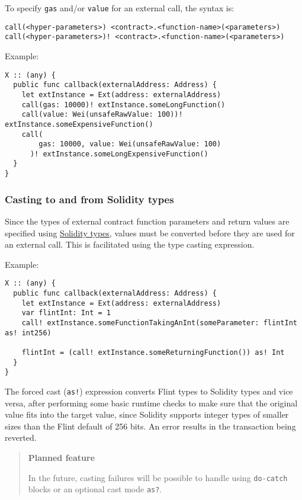 To specify \texttt{gas} and/or \texttt{value} for an external call, the syntax is:

\begin{verbatim}
call(<hyper-parameters>) <contract>.<function-name>(<parameters>)
call(<hyper-parameters>)! <contract>.<function-name>(<parameters>)
\end{verbatim}

Example:

\begin{verbatim}
X :: (any) {
  public func callback(externalAddress: Address) {
    let extInstance = Ext(address: externalAddress)
    call(gas: 10000)! extInstance.someLongFunction()
    call(value: Wei(unsafeRawValue: 100))! extInstance.someExpensiveFunction()
    call(
        gas: 10000, value: Wei(unsafeRawValue: 100)
      )! extInstance.someLongExpensiveFunction()
  }
}
\end{verbatim}

\subsubsection{Casting to and from Solidity types}
\label{sec:appendix-b-casting-to-and-from-solidity-types}

Since the types of external contract function parameters and return values are specified using \hyperref[sec:appendix-b-solidity-types]{Solidity types}, values must be converted before they are used for an external call. This is facilitated using the type casting expression.

Example:

\begin{verbatim}
X :: (any) {
  public func callback(externalAddress: Address) {
    let extInstance = Ext(address: externalAddress)
    var flintInt: Int = 1
    call! extInstance.someFunctionTakingAnInt(someParameter: flintInt as! int256)

    flintInt = (call! extInstance.someReturningFunction()) as! Int
  }
}
\end{verbatim}

The forced cast (\texttt{as!}) expression converts Flint types to Solidity types and vice versa, after performing some basic runtime checks to make sure that the original value fits into the target value, since Solidity supports integer types of smaller sizes than the Flint default of 256 bits. An error results in the transaction being reverted.

\begin{quote}
\textbf{Planned feature}

In the future, casting failures will be possible to handle using \texttt{do-catch} blocks or an optional cast mode \texttt{as?}.
\end{quote}

